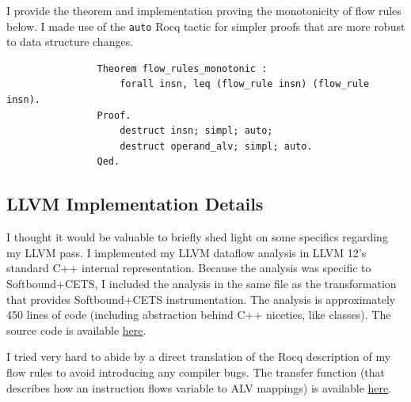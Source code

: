 \documentclass{article}
\begin{document}
                \bigbreak{}

                I provide the theorem and implementation proving the monotonicity
                of flow rules below. I made use of the \verb|auto| Rocq tactic for simpler proofs that are more robust to data structure changes.

                \begin{verbatim}
                Theorem flow_rules_monotonic : 
                    forall insn, leq (flow_rule insn) (flow_rule insn).
                Proof.
                    destruct insn; simpl; auto; 
                    destruct operand_alv; simpl; auto.
                Qed.
                \end{verbatim}
            
    \subsection{LLVM Implementation Details}

        I thought it would be valuable to briefly shed light on some specifics
        regarding my LLVM pass.  I implemented my LLVM dataflow analysis in LLVM 12's standard C++ 
        internal representation. Because the analysis was specific to Softbound+CETS,
        I included the analysis in the same file as the transformation that
        provides Softbound+CETS instrumentation. The analysis is approximately 450
        lines of code (including abstraction behind C++ niceties, like classes).
        The source code is available \href{https://github.com/parthsarkar17/softboundcets-ese5370/blob/009263fa16b6ff7cc22f6afadf9561a9507f60b0/llvm-project/llvm/lib/Transforms/SoftBoundCETS/SoftBoundCETS.cpp#L370}{here}.
    
        \bigbreak{}

        I tried very hard to abide by a direct translation of the Rocq
        description of my flow rules to avoid introducing any compiler bugs. The transfer
        function (that describes how an instruction flows variable to ALV mappings)
        is available \href{https://github.com/parthsarkar17/softboundcets-ese5370/blob/009263fa16b6ff7cc22f6afadf9561a9507f60b0/llvm-project/llvm/lib/Transforms/SoftBoundCETS/SoftBoundCETS.cpp#L601}{here}.
    
        \bigbreak{}
\end{document}
